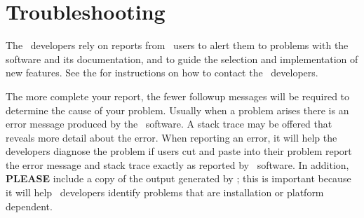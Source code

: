 
\chapter{Troubleshooting}\label{sec:trouble}

The \OOMMF\ developers rely on reports from \OOMMF\ users to alert them
to problems with the software and its
documentation, and to guide the selection and implementation of new
features.  See the  for instructions on how to contact the
\OOMMF\ developers.

The more complete your report, the fewer followup messages will be
required to determine the cause of your problem.  Usually when a problem
arises there is an error message produced by the \OOMMF\ software.  A
stack trace may be offered that reveals more detail about the error.
When reporting an error, it will help the developers diagnose the
problem if users cut and paste into their problem report the error
message and stack trace exactly as reported by \OOMMF\ software.  In
addition, \textbf{PLEASE} include a copy of the output generated by
; this is important
because it will help \OOMMF\ developers identify problems that are
installation or platform dependent.


